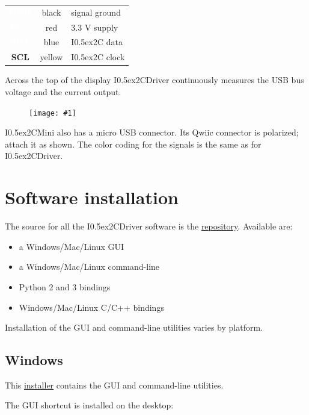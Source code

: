 \documentclass{article}
\newcommand{\two}{\raise0.5ex\hbox{\footnotesize{2}}}
\newcommand{\iic}{I\two{}C}
\newcommand{\iicdriver}{I\two{}CDriver}
\newcommand{\iicmini}{I\two{}CMini}
\newcommand{\png}[1]{
\begin{figure}[H]
\begin{center}
\texttt{[image: \#1]}
\end{center}
\end{figure}
}
\newcommand{\gap}{\vspace{10pt}}
\begin{document}

\gap
\begin{center}
\begin{tabular}{ccl}
\hline
\cellcolor{ccGND}
\textcolor{white}{\textbf{GND}}  & black & signal ground \\
\cellcolor{ccVCC}
\textcolor{white}{\textbf{VCC}}  & red & 3.3 V supply \\
\cellcolor{ccSDA}
\textcolor{white}{\textbf{SDA}}  & blue & \iic{} data \\
\cellcolor{ccSCL}
\textbf{SCL}  & yellow & \iic{} clock \\
\hline
\end{tabular}
\end{center}
\gap

Across the top of the display \iicdriver{} continuously measures the USB bus voltage
and the current output.

\png{img/i2cdriver/i2c_mini_topdown_wired_white_bg}

\iicmini{} also has a micro USB connector.
Its Qwiic connector is polarized; attach it as shown.
The color coding for the signals is the same as for \iicdriver{}.

\newpage
\section{Software installation}

The source for all the \iicdriver{} software is the
\href{https://github.com/jamesbowman/i2cdriver}{repository}.
Available are:

\begin{itemize}
\item a Windows/Mac/Linux GUI
\item a Windows/Mac/Linux command-line
\item Python 2 and 3 bindings
\item Windows/Mac/Linux C/C++ bindings
\end{itemize}

Installation of the GUI and command-line utilities varies by platform.

\subsection{Windows}

This
\href{https://i2cdriver.com/windows}{installer}
contains the GUI and command-line utilities.

The GUI shortcut is installed on the desktop:
\end{document}
